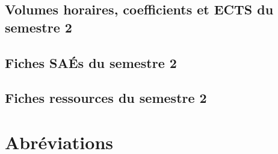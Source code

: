 \documentclass[10pt,lualatex,french]{article}
\begin{document}
\subsection{Volumes horaires, coefficients et ECTS du semestre 2}



\newpage

\subsection{Fiches SAÉs du semestre 2}
\affichageSAE{\sem}

\subsection{Fiches ressources du semestre 2}
\affichageRessource{\sem}

\section{Abréviations}

\begin{multicols}{2}\small

\end{multicols}
\end{document}
